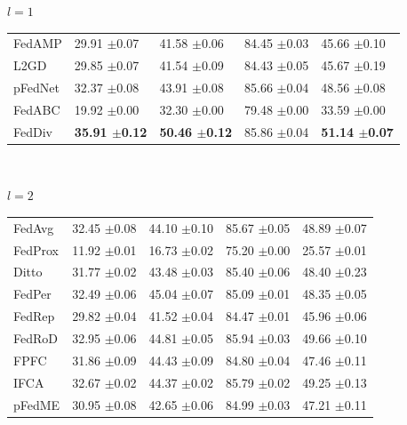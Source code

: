 \documentclass[journal]{IEEEtran}
\begin{document}
\begin{table}
\begin{subtable}[]{$l=1$}
\begin{tabular}{@{}lllll@{}}
			FedAMP   & 29.91 $\pm$0.07          & 41.58 $\pm$0.06          & 84.45 $\pm$0.03          & 45.66 $\pm$0.10          \\
			L2GD     & 29.85 $\pm$0.07          & 41.54 $\pm$0.09          & 84.43 $\pm$0.05          & 45.67 $\pm$0.19          \\
			pFedNet  & 32.37 $\pm$0.08          & 43.91 $\pm$0.08          & 85.66 $\pm$0.04          & 48.56 $\pm$0.08          \\
			FedABC   & 19.92 $\pm$0.00          & 32.30 $\pm$0.00          & 79.48 $\pm$0.00          & 33.59 $\pm$0.00          \\
			FedDiv   & \textbf{35.91 $\pm$0.12} & \textbf{50.46 $\pm$0.12} & 85.86 $\pm$0.04          & \textbf{51.14 $\pm$0.07} \\ \bottomrule
		\end{tabular}
	\end{subtable}
	\centering
	\\
	\begin{subtable}[]{$l=2$}
		\begin{tabular}{@{}lllll@{}}
			\specialrule{0em}{3pt}{1pt}
			\toprule
			FedAvg   & 32.45 $\pm$0.08          & 44.10 $\pm$0.10          & 85.67 $\pm$0.05          & 48.89 $\pm$0.07          \\
			FedProx  & 11.92 $\pm$0.01          & 16.73 $\pm$0.02          & 75.20 $\pm$0.00          & 25.57 $\pm$0.01          \\
			Ditto    & 31.77 $\pm$0.02          & 43.48 $\pm$0.03          & 85.40 $\pm$0.06          & 48.40 $\pm$0.23          \\
			FedPer   & 32.49 $\pm$0.06          & 45.04 $\pm$0.07          & 85.09 $\pm$0.01          & 48.35 $\pm$0.05          \\
			FedRep   & 29.82 $\pm$0.04          & 41.52 $\pm$0.04          & 84.47 $\pm$0.01          & 45.96 $\pm$0.06          \\
			FedRoD   & 32.95 $\pm$0.06          & 44.81 $\pm$0.05          & 85.94 $\pm$0.03          & 49.66 $\pm$0.10          \\
			FPFC     & 31.86 $\pm$0.09          & 44.43 $\pm$0.09          & 84.80 $\pm$0.04          & 47.46 $\pm$0.11          \\
			IFCA     & 32.67 $\pm$0.02          & 44.37 $\pm$0.02          & 85.79 $\pm$0.02          & 49.25 $\pm$0.13          \\
			pFedME   & 30.95 $\pm$0.08          & 42.65 $\pm$0.06          & 84.99 $\pm$0.03          & 47.21 $\pm$0.11          \\

\end{tabular}
\end{subtable}
\end{table}
\end{document}
